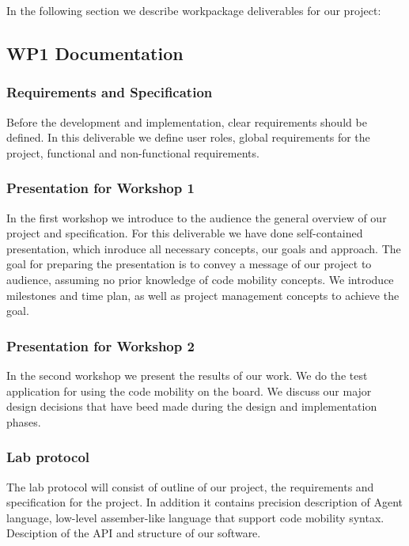 \documentclass{scrreprt}
\begin{document}
In the following section we describe workpackage deliverables for our project:

	\subsection{WP1 Documentation}

	\subsubsection{Requirements and Specification}

Before the development and implementation, clear requirements should be defined.
In this deliverable we define user roles, global requirements for the project, functional and non-functional requirements.

	\subsubsection{Presentation for Workshop 1}

In the first workshop we introduce to the audience the general overview of our project and specification. 
For this deliverable we have done self-contained presentation, which inroduce all necessary concepts, our goals and approach.
The goal for preparing the presentation is to convey a message of our project
to audience, assuming no prior knowledge of code mobility concepts.
We introduce milestones and time plan, as well as project management concepts to achieve the goal.

	\subsubsection{Presentation for Workshop 2}

In the second workshop we present the results of our work.
We do the test application for using the code mobility on the board.
We discuss our major design decisions that have beed made during the design and implementation phases.

	\subsubsection{Lab protocol}

The lab protocol will consist of outline of our project, the requirements and specification for the project.
In addition it contains precision description of Agent language, low-level assember-like language that support code mobility syntax.
Desciption of the API and structure of our software.
\end{document}
